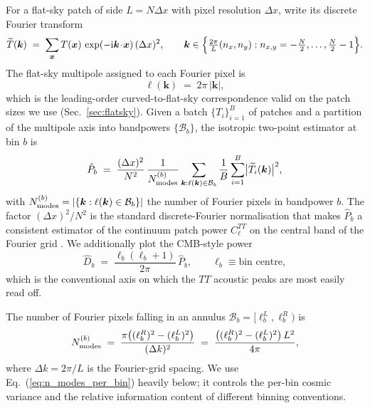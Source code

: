 \documentclass[11pt]{article}
\theoremstyle{definition}
\begin{document}
For a flat-sky patch of side $L=N\Delta x$ with pixel resolution $\Delta x$, write its discrete Fourier transform
\begin{equation}
  \widetilde T(\bm k)
  \;=\;\sum_{\bm x} T(\bm x)\,\exp(-\mathrm i\bm k\!\cdot\!\bm x)\,(\Delta x)^2,\qquad
  \bm k\in\Bigl\{\tfrac{2\pi}{L}(n_x,n_y):n_{x,y}=-\tfrac{N}{2},\ldots,\tfrac{N}{2}-1\Bigr\}.
  \label{eq:patch_fft}
\end{equation}
The flat-sky multipole assigned to each Fourier pixel is
\begin{equation}
  \ell(\bm k)\;=\;2\pi\,|\bm k|,
\end{equation}
which is the leading-order curved-to-flat-sky correspondence valid on the patch sizes we use (Sec.~\ref{sec:flatsky}). Given a batch $\{T_i\}_{i=1}^B$ of patches and a partition of the multipole axis into bandpowers $\{\mathcal B_b\}$, the isotropic two-point estimator at bin $b$ is
\begin{equation}
  \hat P_b
  \;=\;\frac{(\Delta x)^2}{N^2}\,
  \frac{1}{N^{(b)}_{\rm modes}}
  \sum_{\bm k:\ell(\bm k)\in\mathcal B_b}
  \frac{1}{B}\sum_{i=1}^B
  \bigl|\widetilde T_i(\bm k)\bigr|^2,
  \label{eq:flatsky_tt_estimator}
\end{equation}
with $N^{(b)}_{\rm modes}=|\{\bm k:\ell(\bm k)\in\mathcal B_b\}|$ the number of Fourier pixels in bandpower $b$. The factor $(\Delta x)^2/N^2$ is the standard discrete-Fourier normalisation that makes $\hat P_b$ a consistent estimator of the continuum patch power $C_\ell^{TT}$ on the central band of the Fourier grid \cite{hivon2002master}. We additionally plot the CMB-style power
\begin{equation}
  \hat D_b
  \;=\;\frac{\ell_b(\ell_b+1)}{2\pi}\,\hat P_b,\qquad
  \ell_b\equiv\text{bin centre},
  \label{eq:patch_dell}
\end{equation}
which is the conventional axis on which the $TT$ acoustic peaks are most easily read off.

The number of Fourier pixels falling in an annulus $\mathcal B_b=[\ell_b^L,\ell_b^R)$ is
\begin{equation}
  N^{(b)}_{\rm modes}
  \;=\;\frac{\pi\bigl((\ell_b^R)^2-(\ell_b^L)^2\bigr)}{(\Delta k)^2}
  \;=\;\frac{\bigl((\ell_b^R)^2-(\ell_b^L)^2\bigr)\,L^2}{4\pi},
  \label{eq:n_modes_per_bin}
\end{equation}
where $\Delta k=2\pi/L$ is the Fourier-grid spacing. We use Eq.~(\ref{eq:n_modes_per_bin}) heavily below; it controls the per-bin cosmic variance and the relative information content of different binning conventions.
\end{document}
